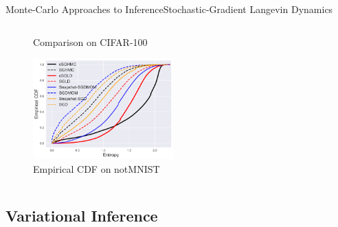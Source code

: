 \documentclass[AERbeamer%
              ,optEnglish%
              ,optBiber%
              ,optBibstyleAlphabetic%
              ,optBeamerClassicFormat%
              ]{AERlatex}%
\begin{document}
\begin{frame}[c]{Monte-Carlo Approaches to Inference}{Stochastic-Gradient Langevin Dynamics}
\begin{columns}[T]
\begin{column}{0.48\textwidth}
\begin{figure}
            \caption{Comparison on CIFAR-100}
        \end{figure}
        \begin{figure}
            \centering
            \includegraphics[width=0.48\textwidth]{SGMCMCEmpiricalCDF.png}
            \caption{Empirical CDF on notMNIST}
        \end{figure}
    \end{column}
\end{columns}
\end{frame}



\subsection{Variational Inference}
\end{document}
